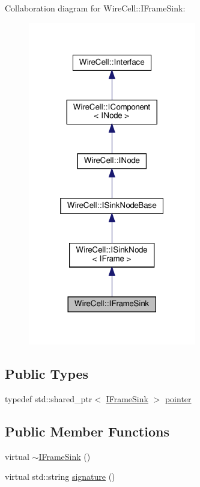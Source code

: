 Collaboration diagram for Wire\+Cell\+:\+:I\+Frame\+Sink\+:
\nopagebreak
\begin{figure}[H]
\begin{center}
\leavevmode
\includegraphics[width=208pt]{class_wire_cell_1_1_i_frame_sink__coll__graph}
\end{center}
\end{figure}
\subsection*{Public Types}
\begin{DoxyCompactItemize}
\item 
typedef std\+::shared\+\_\+ptr$<$ \hyperlink{class_wire_cell_1_1_i_frame_sink}{I\+Frame\+Sink} $>$ \hyperlink{class_wire_cell_1_1_i_frame_sink_afa2121ec1bfe992a2fe80c79c4a80aa0}{pointer}
\end{DoxyCompactItemize}
\subsection*{Public Member Functions}
\begin{DoxyCompactItemize}
\item 
virtual \hyperlink{class_wire_cell_1_1_i_frame_sink_a4f82d5eaca846b5963b3fc88b238811e}{$\sim$\+I\+Frame\+Sink} ()
\item 
virtual std\+::string \hyperlink{class_wire_cell_1_1_i_frame_sink_af86ff5ba30366290d7ac9155c805e59b}{signature} ()
\end{DoxyCompactItemize}


